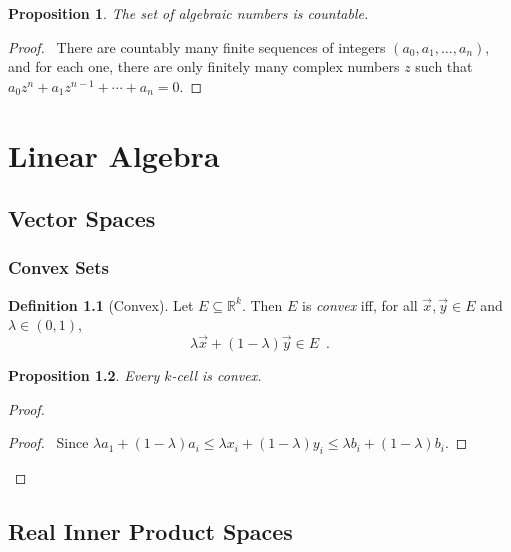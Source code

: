 \documentclass{book}
\let\qed\relax
\newtheorem{prop}{Proposition}[chapter]
\theoremstyle{definition}
\newtheorem{df}[prop]{Definition}
\begin{document}
\begin{prop}
The set of algebraic numbers is countable.
\end{prop}

\begin{proof}
\pf\ There are countably many finite sequences of integers $(a_0, a_1, \ldots, a_n)$, and for each one, there are only finitely many complex numbers $z$ such that $a_0 z^n + a_1 z^{n-1} + \cdots + a_n = 0$. \qed
\end{proof}

\part{Linear Algebra}

\newcommand{\tr}[1]{\ensuremath{\operatorname{tr}}}

\chapter{Vector Spaces}

\section{Convex Sets}

\begin{df}[Convex]
Let $E \subseteq \mathbb{R}^k$. Then $E$ is \emph{convex} iff, for all $\vec{x}, \vec{y} \in E$ and $\lambda \in (0,1)$,
\[ \lambda \vec{x} + (1 - \lambda) \vec{y} \in E \enspace . \]
\end{df}

\begin{prop}
Every $k$-cell is convex.
\end{prop}

\begin{proof}
\pf
{}
\begin{proof}
\pf\ Since $\lambda a_1 + (1-\lambda) a_i \leq \lambda x_i + (1 - \lambda) y_i \leq \lambda b_i + (1 - \lambda) b_i$.
\end{proof}
\qed
\end{proof}

\chapter{Real Inner Product Spaces}
\end{document}

